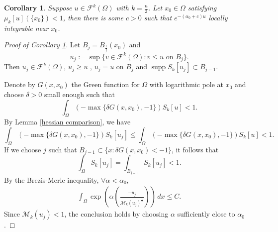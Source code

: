 \documentclass[10pt,a4paper]{amsart}
\newtheorem{cor}{Corollary}
\begin{document}
\begin{cor}\label{loc version of BM inequality}
	Suppose $u\in \mathcal F^k(\Omega)$ with $k=\frac{n}{2}$. Let $x_0\in \Omega$ satisfying $\mu_k[u](\{x_0\})<1$, then there is some $c>0$ such that $e^{-(\alpha_0+c) u} $ locally integrable near $x_0$.
\end{cor}

\begin{proof}[Proof of Corollary \ref{loc version of BM inequality}]
	Let $B_j=B_{\frac{1}{j}}(x_0)$ and
	\[
	u_j := \sup \{ v \in \mathcal{F}^k(\Omega) : v \leq u \text{ on } B_j \}.
	\]
	Then $u_j \in \mathcal{F}^k(\Omega)$, $u_j \geq u$ , $u_j = u$ on $B_j$ and $\operatorname{supp}S_k [u_j]\subset B_{j-1}$. 
	
	Denote by $G(x,x_0)$ the Green function for $\Omega$ with logarithmic pole at $x_0$ and
	choose $\delta > 0$ small enough such that
	\[
	\int_{\Omega} (-\max\{\delta G(x,x_0), -1\}) S_k [u]< 1.
	\]
	By Lemma \ref{hessian comparison}, we have
	\[
	\int_{\Omega} (-\max\{\delta G(x,x_0), -1\}) S_k [u_j]
	\leq \int_{\Omega} (-\max\{\delta G(x,x_0), -1\}) S_k [u]< 1.
	\]
	If we choose $j$ such that $B_{j-1}\subset \{x: \delta G(x,x_0) < -1\}$, it follows that
	\[
	\int_{\Omega} S_k[u_j] = \int_{B_{j-1}} S_k[u_j]< 1.
	\]
	By the Brezis-Merle inequality, $\forall \alpha<\alpha_0$,
	\begin{eqnarray*}
		\int_{\Omega} \exp\left(\alpha\left(\frac{-u_j}{\mathcal M_k(u_j)^{\frac{1}{k}}}\right)\right)\,dx\leq C.
	\end{eqnarray*}
	Since $\mathcal M_k(u_j)<1$, the conclusion holds by choosing $\alpha$ sufficiently close to $\alpha_0$.
\end{proof}
\end{document}
